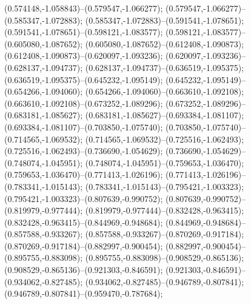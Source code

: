  (0.574148,-1.058843)--(0.579547,-1.066277);
 (0.579547,-1.066277)--(0.585347,-1.072883);
 (0.585347,-1.072883)--(0.591541,-1.078651);
 (0.591541,-1.078651)--(0.598121,-1.083577);
 (0.598121,-1.083577)--(0.605080,-1.087652);
 (0.605080,-1.087652)--(0.612408,-1.090873);
 (0.612408,-1.090873)--(0.620097,-1.093236);
 (0.620097,-1.093236)--(0.628137,-1.094737);
 (0.628137,-1.094737)--(0.636519,-1.095375);
 (0.636519,-1.095375)--(0.645232,-1.095149);
 (0.645232,-1.095149)--(0.654266,-1.094060);
 (0.654266,-1.094060)--(0.663610,-1.092108);
 (0.663610,-1.092108)--(0.673252,-1.089296);
 (0.673252,-1.089296)--(0.683181,-1.085627);
 (0.683181,-1.085627)--(0.693384,-1.081107);
 (0.693384,-1.081107)--(0.703850,-1.075740);
 (0.703850,-1.075740)--(0.714565,-1.069532);
 (0.714565,-1.069532)--(0.725516,-1.062493);
 (0.725516,-1.062493)--(0.736690,-1.054629);
 (0.736690,-1.054629)--(0.748074,-1.045951);
 (0.748074,-1.045951)--(0.759653,-1.036470);
 (0.759653,-1.036470)--(0.771413,-1.026196);
 (0.771413,-1.026196)--(0.783341,-1.015143);
 (0.783341,-1.015143)--(0.795421,-1.003323);
 (0.795421,-1.003323)--(0.807639,-0.990752);
 (0.807639,-0.990752)--(0.819979,-0.977444);
 (0.819979,-0.977444)--(0.832428,-0.963415);
 (0.832428,-0.963415)--(0.844969,-0.948684);
 (0.844969,-0.948684)--(0.857588,-0.933267);
 (0.857588,-0.933267)--(0.870269,-0.917184);
 (0.870269,-0.917184)--(0.882997,-0.900454);
 (0.882997,-0.900454)--(0.895755,-0.883098);
 (0.895755,-0.883098)--(0.908529,-0.865136);
 (0.908529,-0.865136)--(0.921303,-0.846591);
 (0.921303,-0.846591)--(0.934062,-0.827485);
 (0.934062,-0.827485)--(0.946789,-0.807841);
 (0.946789,-0.807841)--(0.959470,-0.787684);
